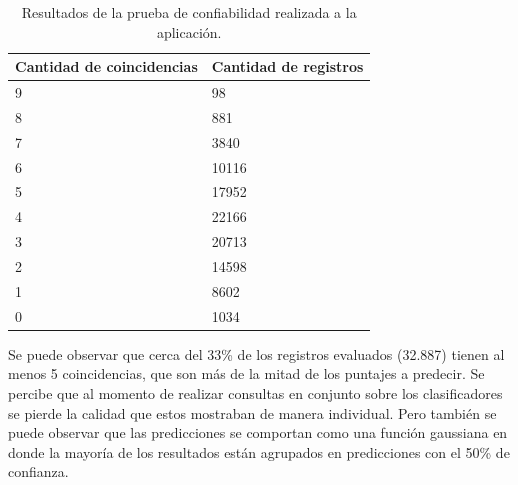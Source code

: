 \begin{table}[!Hhtb]
\centering
\begin{tabular}{|p{6.5cm}|p{6.5cm}|}
\hline
	\rowcolor[gray]{0.9} 
	\textbf{Cantidad de coincidencias} &
	\textbf{Cantidad de registros} 
	\\
\hline
9 & 98\\
\hline
8 & 881\\
\hline
7 & 3840\\
\hline
6 & 10116\\
\hline
5 & 17952\\
\hline
4 & 22166\\
\hline
3 & 20713\\
\hline
2 & 14598\\
\hline
1 & 8602\\
\hline
0 & 1034\\
\hline
\end{tabular}
\caption{Resultados de la prueba de confiabilidad realizada a la aplicación.}
\label{tab:cuadro39}
\end{table}
Se puede observar que cerca del 33\% de los registros evaluados (32.887) tienen al menos 5 coincidencias, que son más de la mitad de los puntajes a predecir. Se percibe que al momento de realizar consultas en conjunto sobre los clasificadores se pierde la calidad que estos mostraban de manera individual. Pero también se puede observar que las predicciones se comportan como una función gaussiana en  donde la mayoría de los resultados están agrupados en predicciones con el 50\% de confianza.